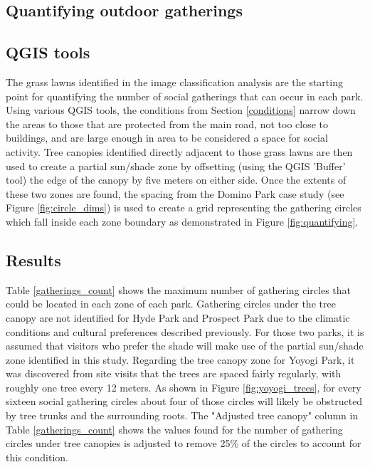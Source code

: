\begin{multicols}{2}

\section{Quantifying outdoor gatherings}
\subsection{QGIS tools}
The grass lawns identified in the image classification analysis are the starting point for quantifying the number of social gatherings that can occur in each park. Using various QGIS tools, the conditions from Section \ref{conditions} narrow down the areas to those that are protected from the main road, not too close to buildings, and are large enough in area to be considered a space for social activity. Tree canopies identified directly adjacent to those grass lawns are then used to create a partial sun/shade zone by offsetting (using the QGIS 'Buffer' tool) the edge of the canopy by five meters on either side. Once the extents of these two zones are found, the spacing from the Domino Park case study (see Figure \ref{fig:circle_dims}) is used to create a grid representing the gathering circles which fall inside each zone boundary as demonstrated in Figure \ref{fig:quantifying}.

\subsection{Results}
Table \ref{gatherings_count} shows the maximum number of gathering circles that could be located in each zone of each park. Gathering circles under the tree canopy are not identified for Hyde Park and Prospect Park due to the climatic conditions and cultural preferences described previously. For those two parks, it is assumed that visitors who prefer the shade will make use of the partial sun/shade zone identified in this study. Regarding the tree canopy zone for Yoyogi Park, it was discovered from site visits that the trees are spaced fairly regularly, with roughly one tree every 12 meters. As shown in Figure \ref{fig:yoyogi_trees}, for every sixteen social gathering circles about four of those circles will likely be obstructed by tree trunks and the surrounding roots. The "Adjusted tree canopy" column in Table \ref{gatherings_count} shows the values found for the number of gathering circles under tree canopies is adjusted to remove 25\% of the circles to account for this condition. 


\end{multicols}
